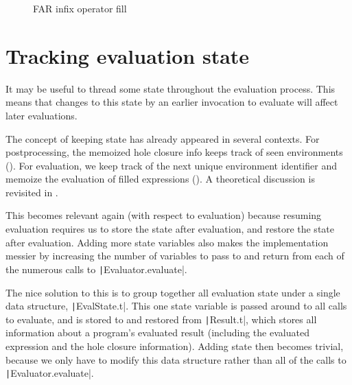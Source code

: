 \begin{figure}
  \centering
  \begin{singlespace}
  \end{singlespace}
  \caption{FAR infix operator fill}
  \label{fig:far-infix-operator-fill}
\end{figure}

\section{Tracking evaluation state}
\label{sec:eval-state}

It may be useful to thread some state throughout the evaluation process. This means that changes to this state by an earlier invocation to evaluate will affect later evaluations.

The concept of keeping state has already appeared in several contexts. For postprocessing, the memoized hole closure info keeps track of seen environments (). For evaluation, we keep track of the next unique environment identifier and memoize the evaluation of filled expressions (). A theoretical discussion is revisited in .

This becomes relevant again (with respect to evaluation) because resuming evaluation requires us to store the state after evaluation, and restore the state after evaluation. Adding more state variables also makes the implementation messier by increasing the number of variables to pass to and return from each of the numerous calls to \texttt|Evaluator.evaluate|.

The nice solution to this is to group together all evaluation state under a single data structure, \texttt|EvalState.t|. This one state variable is passed around to all calls to evaluate, and is stored to and restored from \texttt|Result.t|, which stores all information about a program's evaluated result (including the evaluated expression and the hole closure information). Adding state then becomes trivial, because we only have to modify this data structure rather than all of the calls to \texttt|Evaluator.evaluate|.

